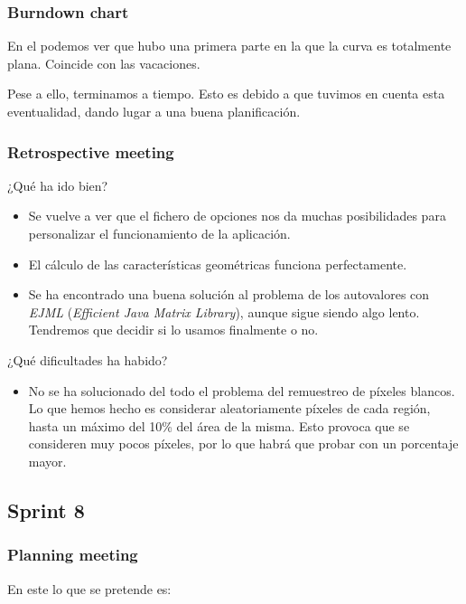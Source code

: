 \subsubsection*{Burndown chart}
En el \burndownchart{}  podemos ver que hubo una primera parte en la que la curva es totalmente plana. Coincide con las vacaciones.


Pese a ello, terminamos a tiempo. Esto es debido a que tuvimos en cuenta esta eventualidad, dando lugar a una buena planificación.


\subsubsection*{Retrospective meeting}
¿Qué ha ido bien?
\begin{itemize}
 \item Se vuelve a ver que el fichero de opciones nos da muchas posibilidades para personalizar el funcionamiento de la aplicación.
 \item El cálculo de las características geométricas funciona perfectamente.
 \item Se ha encontrado una buena solución al problema de los autovalores con \textit{EJML} (\textit{Efficient Java Matrix Library}), aunque sigue siendo algo lento. Tendremos que decidir si lo usamos finalmente o no.
\end{itemize}

¿Qué dificultades ha habido?
\begin{itemize}
 \item No se ha solucionado del todo el problema del remuestreo de píxeles blancos. Lo que hemos hecho es considerar aleatoriamente píxeles de cada región, hasta un máximo del 10\% del área de la misma. Esto provoca que se consideren muy pocos píxeles, por lo que habrá que probar con un porcentaje mayor.
\end{itemize}


\subsection{Sprint 8}
\subsubsection*{Planning meeting}
En este \sprint{} lo que se pretende es:

